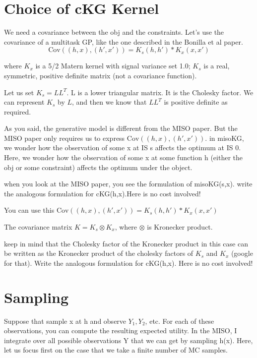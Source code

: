 \documentclass[12pt]{article}
\begin{document}
\section{Choice of cKG Kernel}
We need a covariance between the obj and the constraints. Let's use the covariance of a multitask GP, like the one described in the Bonilla et al paper.
\begin{equation*}
\text{Cov}( (h,x), (h',x') ) = K_s(h,h') * K_x(x,x')
\end{equation*}

where $K_x$ is a 5/2 Matern kernel with signal variance set 1.0; $K_s$ is a real, symmetric, positive definite matrix (not a covariance function).

Let us set $K_s = L L^T$. L is a lower triangular matrix. It is the Cholesky factor.
We can represent $K_s$ by $L$, and then we know that $L L^T$ is positive definite as required.

As you said, the generative model is different from the MISO paper. But the MISO paper only requires us to express $\text{Cov}( (h,x), (h',x') )$. in misoKG, we wonder how the observation of some x at IS s affects the optimum at IS 0. Here, we wonder how the observation of some x at some function h (either the obj or some constraint) affects the optimum under the object.

when you look at the MISO paper, you see the formulation of misoKG(s,x). write the analogous formulation for cKG(h,x).Here is no cost involved!

You can use this $\text{Cov}( (h,x), (h',x') ) = K_s(h,h') * K_x(x,x')$

The covariance matrix $ K = K_s \otimes K_x$, where $\otimes$ is Kronecker product.

keep in mind that the Cholesky factor of the Kronecker product in this case can be written as the Kronecker product of the cholesky factors of $K_s$ and $K_x$ (google for that). Write the analogous formulation for cKG(h,x). Here is no cost involved!
\section{Sampling}

Suppose that sample x at h and observe $Y_1, Y_2$, etc. For each of these observations, you can compute the resulting expected utility. In the MISO, I integrate over all possible observations Y that we can get by sampling h(x). Here, let us focus first on the case that we take a finite number of MC samples.
\end{document}
